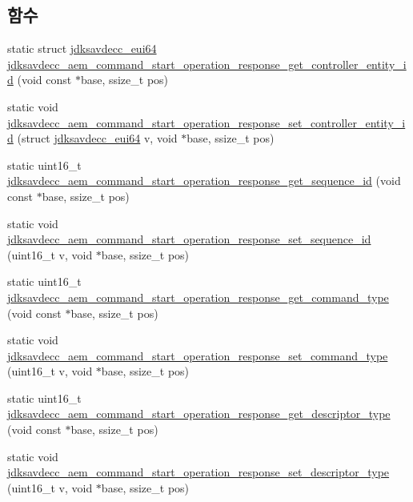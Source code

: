 \subsection*{함수}
\begin{DoxyCompactItemize}
\item 
static struct \hyperlink{structjdksavdecc__eui64}{jdksavdecc\+\_\+eui64} \hyperlink{group__command__start__operation__response_ga38059c393d730193cb2c300436d132c7}{jdksavdecc\+\_\+aem\+\_\+command\+\_\+start\+\_\+operation\+\_\+response\+\_\+get\+\_\+controller\+\_\+entity\+\_\+id} (void const $\ast$base, ssize\+\_\+t pos)
\item 
static void \hyperlink{group__command__start__operation__response_ga10c15454ad9ae845220f96334d04f596}{jdksavdecc\+\_\+aem\+\_\+command\+\_\+start\+\_\+operation\+\_\+response\+\_\+set\+\_\+controller\+\_\+entity\+\_\+id} (struct \hyperlink{structjdksavdecc__eui64}{jdksavdecc\+\_\+eui64} v, void $\ast$base, ssize\+\_\+t pos)
\item 
static uint16\+\_\+t \hyperlink{group__command__start__operation__response_ga22ff40f88725d0283128036555c12f70}{jdksavdecc\+\_\+aem\+\_\+command\+\_\+start\+\_\+operation\+\_\+response\+\_\+get\+\_\+sequence\+\_\+id} (void const $\ast$base, ssize\+\_\+t pos)
\item 
static void \hyperlink{group__command__start__operation__response_ga3f38aa2107eee5cf0fc9bce36fda65c8}{jdksavdecc\+\_\+aem\+\_\+command\+\_\+start\+\_\+operation\+\_\+response\+\_\+set\+\_\+sequence\+\_\+id} (uint16\+\_\+t v, void $\ast$base, ssize\+\_\+t pos)
\item 
static uint16\+\_\+t \hyperlink{group__command__start__operation__response_ga15a26bc78b736ef51ab40806eadfa3d8}{jdksavdecc\+\_\+aem\+\_\+command\+\_\+start\+\_\+operation\+\_\+response\+\_\+get\+\_\+command\+\_\+type} (void const $\ast$base, ssize\+\_\+t pos)
\item 
static void \hyperlink{group__command__start__operation__response_ga968324d6a719cdfdd45d9a4ccfcf3366}{jdksavdecc\+\_\+aem\+\_\+command\+\_\+start\+\_\+operation\+\_\+response\+\_\+set\+\_\+command\+\_\+type} (uint16\+\_\+t v, void $\ast$base, ssize\+\_\+t pos)
\item 
static uint16\+\_\+t \hyperlink{group__command__start__operation__response_gac02ea7a7cf4a61aa786fc7ec450e5aeb}{jdksavdecc\+\_\+aem\+\_\+command\+\_\+start\+\_\+operation\+\_\+response\+\_\+get\+\_\+descriptor\+\_\+type} (void const $\ast$base, ssize\+\_\+t pos)
\item 
static void \hyperlink{group__command__start__operation__response_ga3e0e4f57bb9fb0c0e64c08d840a6722f}{jdksavdecc\+\_\+aem\+\_\+command\+\_\+start\+\_\+operation\+\_\+response\+\_\+set\+\_\+descriptor\+\_\+type} (uint16\+\_\+t v, void $\ast$base, ssize\+\_\+t pos)

\end{DoxyCompactItemize}
